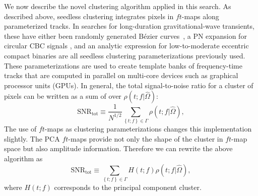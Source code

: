 \documentclass[prd,showpacs,superscriptaddress,twocolumn,
floatfix,preprintnumbers,altaffilletter]{revtex4}
\begin{document}
We now describe the novel clustering algorithm applied in this search.
As described above, seedless clustering integrates pixels in $ft$-maps along parameterized tracks.
In searches for long-duration gravitational-wave transients, these have either been randomly generated B\'ezier curves~\cite{Far1996,ThCo2013,ThCo2014,CoMe2015b,ThCo2015}, a PN expansion for circular CBC signals \cite{CoTh2014}, and an analytic expression for low-to-moderate eccentric compact binaries \cite{CoMe2015} are all seedless clustering parameterizations previously used.
These parameterizations are used to create template banks of frequency-time tracks that are computed in parallel on multi-core devices such as graphical processor units (GPUs). 
In general, the total signal-to-noise ratio for a cluster of pixels can be written as a sum of over $\rho(t;f|\hat\Omega)$:
\begin{equation}\label{eq:sum}
  \text{SNR}_\text{tot} \equiv
  \frac{1}{N^{1/2}}
  \sum_{\left\{t;f\right\}\in\Gamma} \rho(t;f|\hat\Omega) ,
\end{equation}
The use of $ft$-maps as clustering parameterizations changes this implementation slightly. The PCA $ft$-maps provide not only the shape of the cluster in $ft$-map space but also amplitude information. 
Therefore we can rewrite the above algorithm as 
\begin{equation}\label{eq:sum}
  \text{SNR}_\text{tot} \equiv
  \sum_{\left\{t;f\right\}\in\Gamma} H(t;f) \rho(t;f|\hat\Omega) ,
\end{equation}
where $H(t;f)$ corresponds to the principal component cluster.
\end{document}
